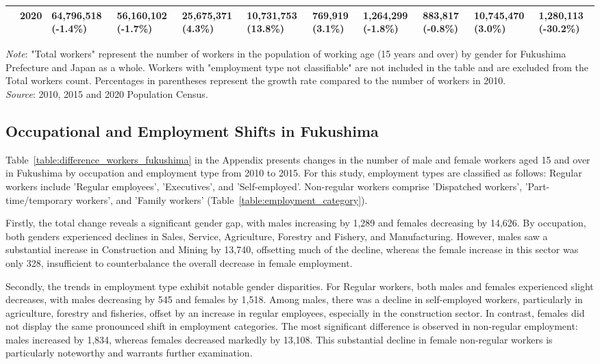 \documentclass[a4paper,12pt]{article}
\begin{document}
\begin{table}[htbp]
{\begin{tabular}{lllllllllll}
 & 2020 & 64,796,518 (-1.4\%) & 56,160,102 (-1.7\%) & \multicolumn{1}{l}{25,675,371 (4.3\%)} & \multicolumn{1}{l}{10,731,753 (13.8\%)} & \multicolumn{1}{l}{769,919 (3.1\%)} & \multicolumn{1}{l}{1,264,299 (-1.8\%)} & \multicolumn{1}{l}{883,817 (-0.8\%)} & \multicolumn{1}{l}{10,745,470 (3.0\%)} & \multicolumn{1}{l}{1,280,113 (-30.2\%)} \\
\hline
\end{tabular}%
}
\addlinespace[0.12em]
\raggedright
\scriptsize
\textit{Note}: "Total workers" represent the number of workers in the population of working age (15 years and over) by gender for Fukushima Prefecture and Japan as a whole. Workers with "employment type not classifiable" are not included in the table and are excluded from the Total workers count. Percentages in parentheses represent the growth rate compared to the number of workers in 2010.\\
\textit{Source}: 2010, 2015 and 2020 Population Census.\\
\label{table:Number_of_workers}
\end{table}


\subsection{Occupational and Employment Shifts in Fukushima}

Table~\ref{table:difference_workers_fukushima} in the Appendix presents changes in the number of male and female workers aged 15 and over in Fukushima by occupation and employment type from 2010 to 2015. For this study, employment types are classified as follows: Regular workers include 'Regular employees', 'Executives', and 'Self-employed'. Non-regular workers comprise 'Dispatched workers', 'Part-time/temporary workers', and 'Family workers' (Table~\ref{table:employment_category}).

Firstly, the total change reveals a significant gender gap, with males increasing by 1,289 and females decreasing by 14,626. By occupation, both genders experienced declines in Sales, Service, Agriculture, Forestry and Fishery, and Manufacturing. However, males saw a substantial increase in Construction and Mining by 13,740, offsetting much of the decline, whereas the female increase in this sector was only 328, insufficient to counterbalance the overall decrease in female employment.

Secondly, the trends in employment type exhibit notable gender disparities. For Regular workers, both males and females experienced slight decreases, with males decreasing by 545 and females by 1,518. Among males, there was a decline in self-employed workers, particularly in agriculture, forestry and fisheries, offset by an increase in regular employees, especially in the construction sector. In contrast, females did not display the same pronounced shift in employment categories. The most significant difference is observed in non-regular employment: males increased by 1,834, whereas females decreased markedly by 13,108. This substantial decline in female non-regular workers is particularly noteworthy and warrants further examination.
\end{document}
